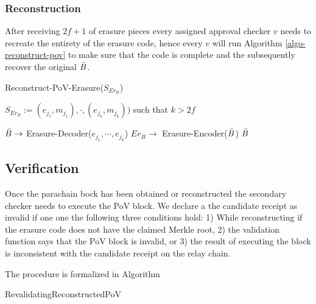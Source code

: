 {{\subsubsection{Reconstruction}
\label{}
After receiving $2f+1$ of erasure pieces every assigned approval checker $v$ needs to recreate the entirety of the erasure code, hence every $v$ will run Algorithm \ref{algo-reconstruct-pov} to make sure that the code is complete and the subsequently recover the original $\bar{B}$.

\begin{algorithm}
  \caption[Reconstruct-PoV-Erasure]{\sc Reconstruct-PoV-Erasure($S_{Er_B}$)}
  \label{algo-reconstruct-pov-erasure}
  \begin{algorithmic}[1]
  \Require
    $S_{Er_B} := {(e_{j_1}, m_{j_1}),\cdot,(e_{j_k}, m_{j_k}))}$ such that $k > 2f$
    
    \State $\bar{B} \rightarrow$ {\sc Erasure-Decoder}(${e_{j_1},\cdots, e_{j_k}}$)
        \State \Return
    \EndIf
    \State $Er_B \rightarrow$ {\sc Erasure-Encoder}($\bar{B}$)
      \State \Return
    \EndIf
    \State \Return $\bar{B}$
  \end{algorithmic}
\end{algorithm}

\subsection{Verification}

Once the parachain bock has been obtained or reconstructed the secondary checker needs to execute the PoV block.
We declare a the candidate receipt as invalid if one one the following three conditions hold: 1) While reconstructing if the erasure code does not have the claimed Merkle root, 2) the validation function says that the PoV block is invalid, or 3) the result  of executing the block is inconsistent with the candidate receipt on the relay chain. 

The procedure is formalized in Algorithm


\begin{algorithm}
  \caption[]{\sc RevalidatingReconstructedPoV}
  \label{algo-revalidating-reconstructed-pov}
  \begin{algorithmic}[1]
    \Require{}
    

\end{algorithmic}
\end{algorithm}}}
